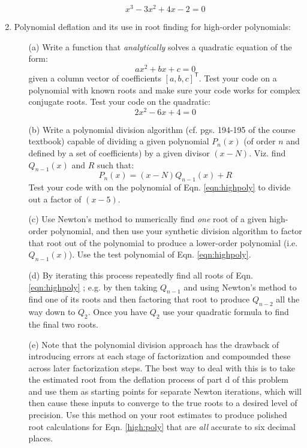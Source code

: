 \documentclass{article}
\begin{document}
\begin{enumerate}
\begin{itemize}
    \begin{equation}
      x^3-3x^2+4x-2=0
    \end{equation}  
  \end{itemize}
  \item Polynomial deflation and its use in root finding for high-order polynomials:  
  \begin{itemize}
    \item[(a)]  Write a function that \emph{analytically} solves a quadratic equation of the form:
    \begin{equation}
      a x^2 + b x + c = 0 
    \end{equation}
    given a column vector of coefficients $[a, b, c]^\mathsf{T}$.  Test your code on a polynomial with known roots and make sure your code works for complex conjugate roots.  Test your code on the quadratic:
    \begin{equation}
      2x^2-6x+4=0
    \end{equation}
    \item[(b)]  Write a polynomial division algorithm (cf. pgs. 194-195 of the course textbook) capable of dividing a given polynomial $P_n(x)$ (of order $n$ and defined by a set of coefficients) by a given divisor $(x-N)$.  Viz. find $Q_{n-1}(x)$ and $R$ such that:
    \begin{equation}
      P_n(x) = (x-N) Q_{n-1}(x)+R
    \end{equation}    
    Test your code with on the polynomial of Eqn. \ref{eqn:highpoly} to divide out a factor of $(x-5)$.  
    \item[(c)]  Use Newton's method to numerically find \emph{one} root of a given high-order polynomial, and then use your synthetic division algorithm to factor that root out of the polynomial to produce a lower-order polynomial (i.e. $Q_{n-1}(x)$).  Use the test polynomial of Eqn. \ref{eqn:highpoly}.
    \item[(d)]  By iterating this process repeatedly find all roots of Eqn. \ref{eqn:highpoly} ; e.g. by then taking $Q_{n-1}$ and using Newton's method to find one of its roots and then factoring that root to produce $Q_{n-2}$ all the way down to $Q_2$.  Once you have $Q_2$ use your quadratic formula to find the final two roots.
    \item[(e)]  Note that the polynomial division approach has the drawback of introducing errors at each stage of factorization and compounded these across later factorization steps.  The best way to deal with this is to take the estimated root from the deflation process of part d of this problem and use them as starting points for separate Newton iterations, which will then cause these inputs to converge to the true roots to a desired level of precision.  Use this method on your root estimates to produce polished root calculations for Eqn. \ref{high:poly} that are \emph{all} accurate to six decimal places.  

\end{itemize}
\end{enumerate}
\end{document}
